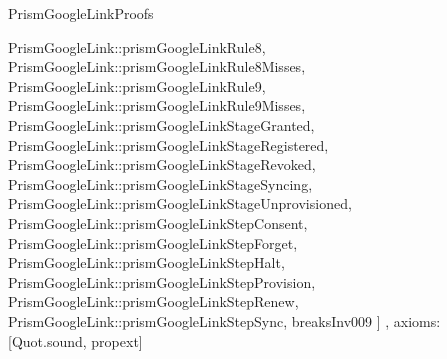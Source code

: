 \begin{lexlean}{PrismGoogleLinkProofs}
\begin{semanticmodule}
{{      PrismGoogleLink::prismGoogleLinkRule8,
      PrismGoogleLink::prismGoogleLinkRule8Misses,
      PrismGoogleLink::prismGoogleLinkRule9,
      PrismGoogleLink::prismGoogleLinkRule9Misses,
      PrismGoogleLink::prismGoogleLinkStageGranted,
      PrismGoogleLink::prismGoogleLinkStageRegistered,
      PrismGoogleLink::prismGoogleLinkStageRevoked,
      PrismGoogleLink::prismGoogleLinkStageSyncing,
      PrismGoogleLink::prismGoogleLinkStageUnprovisioned,
      PrismGoogleLink::prismGoogleLinkStepConsent,
      PrismGoogleLink::prismGoogleLinkStepForget,
      PrismGoogleLink::prismGoogleLinkStepHalt,
      PrismGoogleLink::prismGoogleLinkStepProvision,
      PrismGoogleLink::prismGoogleLinkStepRenew,
      PrismGoogleLink::prismGoogleLinkStepSync,
      breaksInv009
    ]
  },
  axioms: [Quot.sound, propext]
}
\end{semanticmodule}
\end{lexlean}
